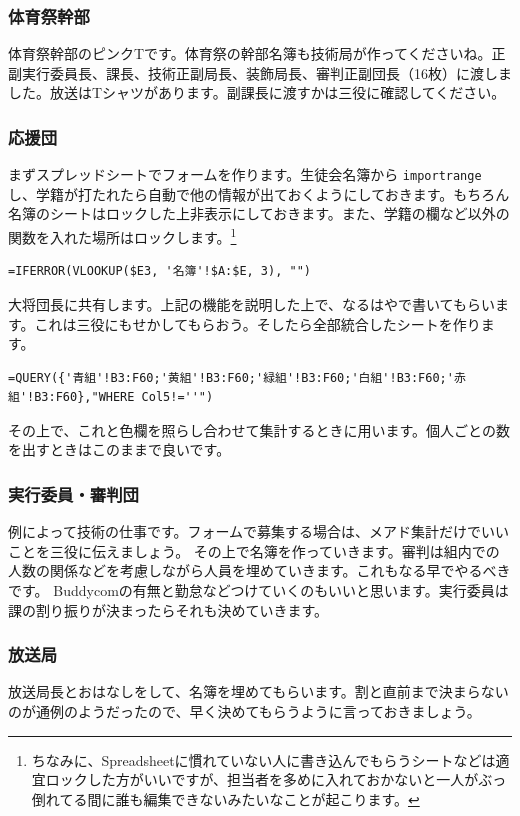 \documentclass[a4paper]{ltjsreport}
\begin{document}
\subsubsection{体育祭幹部}
体育祭幹部のピンクTです。体育祭の幹部名簿も技術局が作ってくださいね。正副実行委員長、課長、技術正副局長、装飾局長、審判正副団長（16枚）に渡しました。放送はTシャツがあります。副課長に渡すかは三役に確認してください。

\subsubsection{応援団}
まずスプレッドシートでフォームを作ります。生徒会名簿から \texttt{importrange} し、学籍が打たれたら自動で他の情報が出ておくようにしておきます。もちろん名簿のシートはロックした上非表示にしておきます。また、学籍の欄など以外の関数を入れた場所はロックします。\footnote{ちなみに、Spreadsheetに慣れていない人に書き込んでもらうシートなどは適宜ロックした方がいいですが、担当者を多めに入れておかないと一人がぶっ倒れてる間に誰も編集できないみたいなことが起こります。}

\begin{lstlisting}
=IFERROR(VLOOKUP($E3, '名簿'!$A:$E, 3), "")
\end{lstlisting}

大将団長に共有します。上記の機能を説明した上で、なるはやで書いてもらいます。これは三役にもせかしてもらおう。そしたら全部統合したシートを作ります。

\begin{lstlisting}
=QUERY({'青組'!B3:F60;'黄組'!B3:F60;'緑組'!B3:F60;'白組'!B3:F60;'赤組'!B3:F60},"WHERE Col5!=''")
\end{lstlisting}

その上で、これと色欄を照らし合わせて集計するときに用います。個人ごとの数を出すときはこのままで良いです。

\subsubsection{実行委員・審判団}
例によって技術の仕事です。フォームで募集する場合は、メアド集計だけでいいことを三役に伝えましょう。
その上で名簿を作っていきます。審判は組内での人数の関係などを考慮しながら人員を埋めていきます。これもなる早でやるべきです。
Buddycomの有無と勤怠などつけていくのもいいと思います。実行委員は課の割り振りが決まったらそれも決めていきます。

\subsubsection{放送局}
放送局長とおはなしをして、名簿を埋めてもらいます。割と直前まで決まらないのが通例のようだったので、早く決めてもらうように言っておきましょう。
\end{document}
